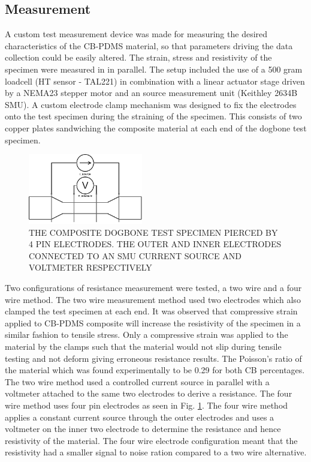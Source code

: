 \subsection*{Measurement}
A custom test measurement device was made for measuring the desired characteristics of the CB-PDMS material, so that parameters driving the data collection could be easily altered. The strain, stress and resistivity of the specimen were measured in in parallel. The setup included the use of a 500 gram loadcell (HT sensor - TAL221) in combination with a linear actuator stage driven by a NEMA23 stepper motor and an source measurement unit (Keithley 2634B SMU). A custom electrode clamp mechanism was designed to fix the electrodes onto the test specimen during the straining of the specimen. This consists of two copper plates sandwiching the composite material at each end of the dogbone test specimen.
\begin{figure}[H]
    \centering
    \includegraphics[width=5cm]{Figures/4wire_specimen.png}
    \caption{THE COMPOSITE DOGBONE TEST SPECIMEN PIERCED BY 4 PIN ELECTRODES. THE OUTER AND INNER ELECTRODES CONNECTED TO AN SMU CURRENT SOURCE AND VOLTMETER RESPECTIVELY}
    \label{fig:four_wire_dogbone}
\end{figure}
Two configurations of resistance measurement were tested, a two wire and a four wire method. The two wire measurement method used two electrodes which also clamped the test specimen at each end. It was observed that compressive strain applied to CB-PDMS composite will increase the resistivity of the specimen in a similar fashion to tensile stress. Only a compressive strain was applied to the material by the clamps such that the material would not slip during tensile testing and not deform giving erroneous resistance results. The Poisson's ratio of the material which was found experimentally to be 0.29 for both CB percentages. The two wire method used a controlled current source in parallel with a voltmeter attached to the same two electrodes to derive a resistance. The four wire method uses four pin electrodes as seen in Fig. \ref{fig:four_wire_dogbone}. The four wire method applies a constant current source through the outer electrodes and uses a voltmeter on the inner two electrode to determine the resistance and hence resistivity of the material. The four wire electrode configuration meant that the resistivity had a smaller signal to noise ration compared to a two wire alternative. 

